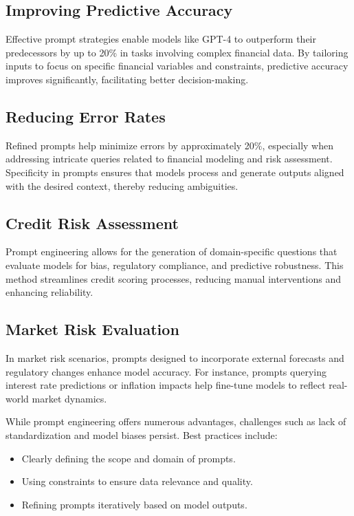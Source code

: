 \documentclass[a4paper,12pt]{scrbook}
\begin{document}
	
	\subsection{Improving Predictive Accuracy}
	Effective prompt strategies enable models like GPT-4 to outperform their predecessors by up to 20\% in tasks involving complex financial data. By tailoring inputs to focus on specific financial variables and constraints, predictive accuracy improves significantly, facilitating better decision-making.
	
	\subsection{Reducing Error Rates}
	Refined prompts help minimize errors by approximately 20\%, especially when addressing intricate queries related to financial modeling and risk assessment. Specificity in prompts ensures that models process and generate outputs aligned with the desired context, thereby reducing ambiguities.
	
	
	\subsection{Credit Risk Assessment}
	Prompt engineering allows for the generation of domain-specific questions that evaluate models for bias, regulatory compliance, and predictive robustness. This method streamlines credit scoring processes, reducing manual interventions and enhancing reliability.
	
	\subsection{Market Risk Evaluation}
	In market risk scenarios, prompts designed to incorporate external forecasts and regulatory changes enhance model accuracy. For instance, prompts querying interest rate predictions or inflation impacts help fine-tune models to reflect real-world market dynamics.
	
	While prompt engineering offers numerous advantages, challenges such as lack of standardization and model biases persist. Best practices include:
	\begin{itemize}
		\item Clearly defining the scope and domain of prompts.
		\item Using constraints to ensure data relevance and quality.
		\item Refining prompts iteratively based on model outputs.
	\end{itemize}
	
\end{document}
